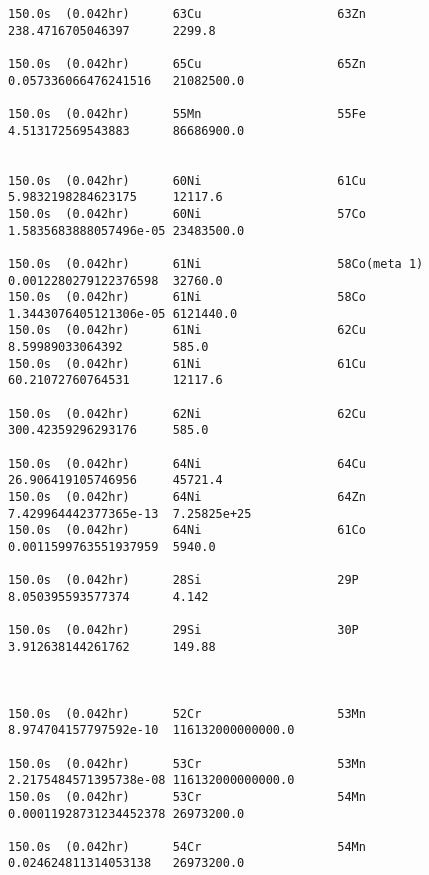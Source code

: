 \begin{lstlisting}[style=sOutputFile,caption={Final results for steel irradiation},label={listing:alexsteel}]
150.0s  (0.042hr)      63Cu                   63Zn                   238.4716705046397      2299.8                

150.0s  (0.042hr)      65Cu                   65Zn                   0.057336066476241516   21082500.0            

150.0s  (0.042hr)      55Mn                   55Fe                   4.513172569543883      86686900.0            


150.0s  (0.042hr)      60Ni                   61Cu                   5.9832198284623175     12117.6               
150.0s  (0.042hr)      60Ni                   57Co                   1.5835683888057496e-05 23483500.0            

150.0s  (0.042hr)      61Ni                   58Co(meta 1)           0.0012280279122376598  32760.0               
150.0s  (0.042hr)      61Ni                   58Co                   1.3443076405121306e-05 6121440.0             
150.0s  (0.042hr)      61Ni                   62Cu                   8.59989033064392       585.0                 
150.0s  (0.042hr)      61Ni                   61Cu                   60.21072760764531      12117.6               

150.0s  (0.042hr)      62Ni                   62Cu                   300.42359296293176     585.0                 

150.0s  (0.042hr)      64Ni                   64Cu                   26.906419105746956     45721.4               
150.0s  (0.042hr)      64Ni                   64Zn                   7.429964442377365e-13  7.25825e+25           
150.0s  (0.042hr)      64Ni                   61Co                   0.0011599763551937959  5940.0                

150.0s  (0.042hr)      28Si                   29P                    8.050395593577374      4.142                 

150.0s  (0.042hr)      29Si                   30P                    3.912638144261762      149.88                



150.0s  (0.042hr)      52Cr                   53Mn                   8.974704157797592e-10  116132000000000.0     

150.0s  (0.042hr)      53Cr                   53Mn                   2.2175484571395738e-08 116132000000000.0     
150.0s  (0.042hr)      53Cr                   54Mn                   0.00011928731234452378 26973200.0            

150.0s  (0.042hr)      54Cr                   54Mn                   0.024624811314053138   26973200.0            



\end{lstlisting}
